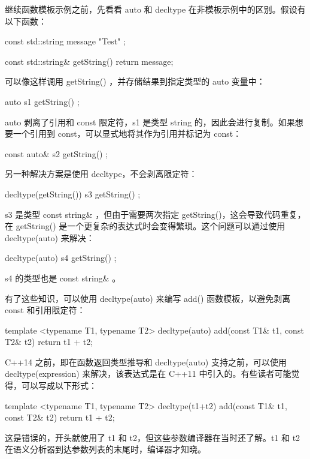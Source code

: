 继续函数模板示例之前，先看看 auto 和 decltype 在非模板示例中的区别。假设有以下函数：

\begin{cpp}
const std::string message { "Test" };

const std::string& getString() { return message; }
\end{cpp}

可以像这样调用 getString() ，并存储结果到指定类型的 auto 变量中：

\begin{cpp}
auto s1 { getString() };
\end{cpp}

auto 剥离了引用和 const 限定符，s1 是类型 string 的，因此会进行复制。如果想要一个引用到 const，可以显式地将其作为引用并标记为 const：

\begin{cpp}
const auto& s2 { getString() };
\end{cpp}

另一种解决方案是使用 decltype，不会剥离限定符：

\begin{cpp}
decltype(getString()) s3 { getString() };
\end{cpp}

s3 是类型 const string\& ，但由于需要两次指定 getString()，这会导致代码重复，在 getString() 是一个更复杂的表达式时会变得繁琐。这个问题可以通过使用 decltype(auto) 来解决：

\begin{cpp}
decltype(auto) s4 { getString() };
\end{cpp}

s4 的类型也是 const string\& 。

有了这些知识，可以使用 decltype(auto) 来编写 add() 函数模板，以避免剥离 const 和引用限定符：

\begin{cpp}
template <typename T1, typename T2>
decltype(auto) add(const T1& t1, const T2& t2) { return t1 + t2; }
\end{cpp}

C++14 之前，即在函数返回类型推导和 decltype(auto) 支持之前，可以使用 decltype(expression) 来解决，该表达式是在 C++11 中引入的。有些读者可能觉得，可以写成以下形式：

\begin{cpp}
template <typename T1, typename T2>
decltype(t1+t2) add(const T1& t1, const T2& t2) { return t1 + t2; }
\end{cpp}

这是错误的，开头就使用了 t1 和 t2，但这些参数编译器在当时还了解。t1 和 t2 在语义分析器到达参数列表的末尾时，编译器才知晓。

